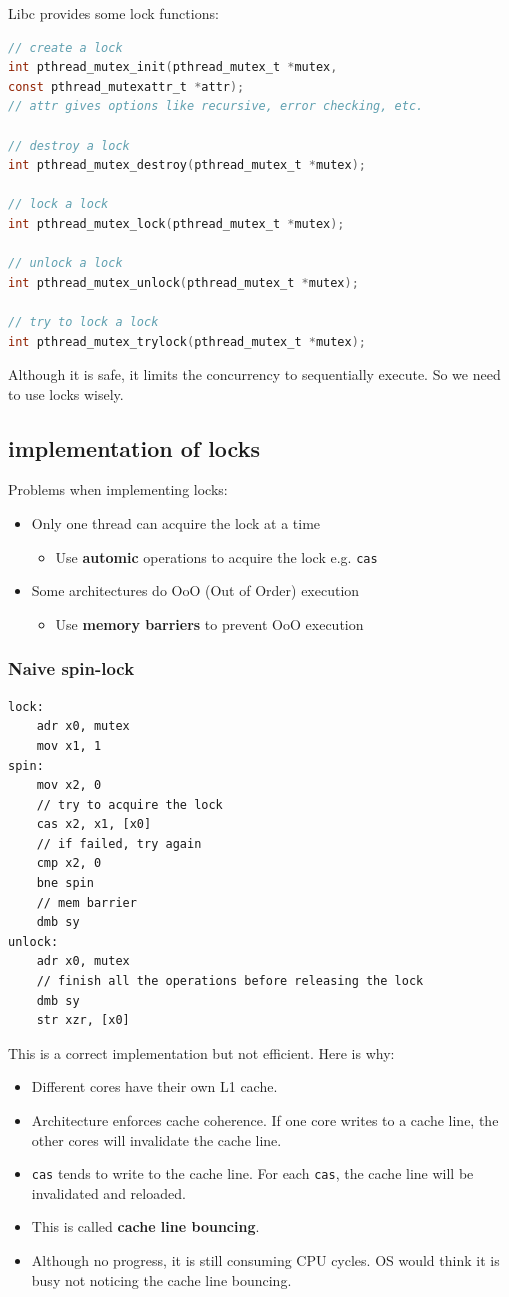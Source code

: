 \documentclass[letterpaper,12pt]{article}
\begin{document}
Libc provides some lock functions:\begin{lstlisting}[language=C]
// create a lock
int pthread_mutex_init(pthread_mutex_t *mutex, 
const pthread_mutexattr_t *attr);
// attr gives options like recursive, error checking, etc.

// destroy a lock
int pthread_mutex_destroy(pthread_mutex_t *mutex);

// lock a lock
int pthread_mutex_lock(pthread_mutex_t *mutex);

// unlock a lock
int pthread_mutex_unlock(pthread_mutex_t *mutex);

// try to lock a lock
int pthread_mutex_trylock(pthread_mutex_t *mutex);
\end{lstlisting}
Although it is safe, it limits the concurrency to sequentially execute. So we need to use locks wisely.
\subsection{implementation of locks}
Problems when implementing locks: \begin{itemize}
    \item Only one thread can acquire the lock at a time \begin{itemize}
        \item Use \textbf{automic} operations to acquire the lock e.g. \texttt{cas}
    \end{itemize}
    \item Some architectures do OoO (Out of Order) execution \begin{itemize}
        \item Use \textbf{memory barriers} to prevent OoO execution
    \end{itemize}
\end{itemize}
\subsubsection{Naive spin-lock}
\begin{lstlisting}
lock:
    adr x0, mutex
    mov x1, 1
spin:
    mov x2, 0
    // try to acquire the lock
    cas x2, x1, [x0]
    // if failed, try again
    cmp x2, 0
    bne spin
    // mem barrier
    dmb sy 
unlock:
    adr x0, mutex
    // finish all the operations before releasing the lock
    dmb sy
    str xzr, [x0]
\end{lstlisting}
This is a correct implementation but not efficient. Here is why:\begin{itemize}
    \item Different cores have their own L1 cache.
    \item Architecture enforces cache coherence. If one core writes to a cache line, the other cores will invalidate the cache line.
    \item \texttt{cas} tends to write to the cache line. For each \texttt{cas}, the cache line will be invalidated and reloaded.
    \item This is called \textbf{cache line bouncing}.
    \item Although no progress, it is still consuming CPU cycles. OS would think it is busy not noticing the cache line bouncing.
\end{itemize}
\end{document}
